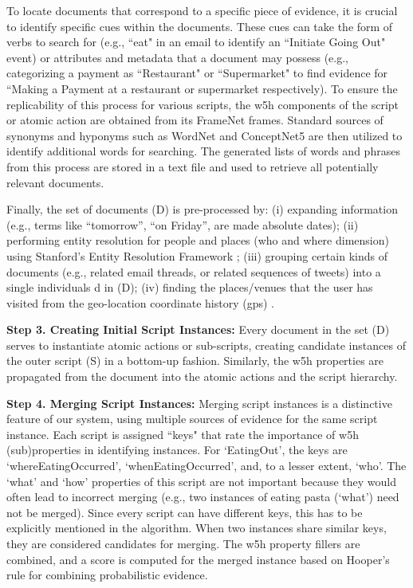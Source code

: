 \documentclass[11pt]{article}
\begin{document}
To locate documents that correspond to a specific piece of evidence, it is crucial to identify specific cues within the documents. These cues can take the form of verbs to search for (e.g., ``eat" in an email to identify an ``Initiate Going Out" event) or attributes and metadata that a document may possess (e.g., categorizing a payment as ``Restaurant" or ``Supermarket" to find evidence for ``Making a Payment at a restaurant or supermarket respectively). To ensure the replicability of this process for various scripts, the w5h components of the script or atomic action are obtained from its FrameNet frames\cite{fillmore2003background}. Standard sources of synonyms and hyponyms such as WordNet and ConceptNet5 \cite{miller1995wordnet, liu2004conceptnet} are then utilized to identify additional words for searching. The generated lists of words and phrases from this process are stored in a text file and used to retrieve all potentially relevant documents.

Finally, the set of documents (D) is pre-processed by: (i) expanding information (e.g., terms like ``tomorrow'', ``on Friday'', are made absolute dates); (ii) performing entity resolution for people and places (who and where dimension) using Stanford's Entity Resolution Framework \cite{serf}; (iii) grouping certain kinds of documents (e.g., related email threads, or related sequences of tweets) into a single individuals d in (D); (iv) finding the places/venues that the user has visited from the geo-location coordinate history (gps) \cite{li2008mining}. 

\textbf{Step 3. Creating Initial Script Instances:}
Every document in the set (D) serves to instantiate atomic actions or sub-scripts, creating candidate instances of the outer script (S) in a bottom-up fashion. Similarly, the w5h properties are propagated from the document into the atomic actions and the script hierarchy.

\textbf{Step 4. Merging Script Instances:}
Merging script instances is a distinctive feature of our system, using multiple sources of evidence for the same script instance. Each script is assigned ``keys" that rate the importance of w5h (sub)properties in identifying instances. For `EatingOut', the keys are `whereEatingOccurred', `whenEatingOccurred', and, to a lesser
extent, `who'. The `what' and `how' properties of this script are not important because they would often lead to incorrect merging (e.g., two instances of eating pasta (`what') need not be merged). Since
every script can have different keys, this has to be explicitly mentioned in the algorithm. When two instances share similar keys, they are considered candidates for merging. The w5h property fillers are combined, and a score is computed for the merged instance based on Hooper's rule \cite{shafer1986combination} for combining probabilistic evidence.
\end{document}
